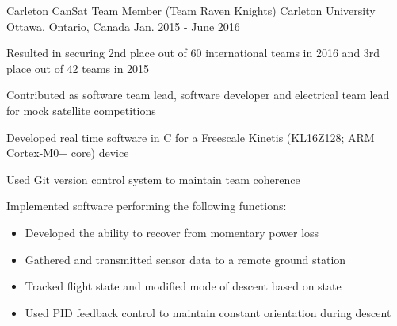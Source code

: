 

\begin{cventries}

  \cventry
    {Carleton CanSat Team Member (Team Raven Knights)} %
    {Carleton University} %
    {Ottawa, Ontario, Canada} %
    {Jan. 2015 - June 2016} %
    {
      \begin{cvitems} %
        \item {Resulted in securing 2nd place out of 60 international teams in 2016 and 3rd place out of 42 teams in 2015}
        \item {Contributed as software team lead, software developer and electrical team lead for mock satellite competitions}
        \item {Developed real time software in C for a Freescale Kinetis (KL16Z128; ARM Cortex-M0+ core) device}
        \item {Used Git version control system to maintain team coherence}
        \item {Implemented software performing the following functions:}
        \begin{itemize}
          \item {Developed the ability to recover from momentary power loss}
          \item {Gathered and transmitted sensor data to a remote ground station}
          \item {Tracked flight state and modified mode of descent based on state}
          \item {Used PID feedback control to maintain constant orientation during descent}
        \end{itemize}
      \end{cvitems}
    }

\end{cventries}
